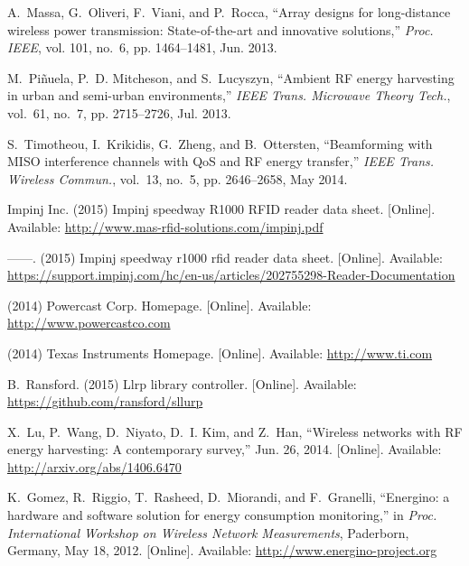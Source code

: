 \documentclass[11pt,draftclsnofoot,journal,onecolumn]{IEEEtran}
\begin{document}
\begin{thebibliography}{10}
{
A.~{Massa}, G.~{Oliveri}, F.~{Viani}, and P.~{Rocca}, ``Array designs for
  long-distance wireless power transmission: State-of-the-art and innovative
  solutions,'' \emph{Proc. {IEEE}}, vol. 101, no.~6, pp. 1464--1481, Jun. 2013.

M.~{Pi{\~{n}}uela}, P.~D. {Mitcheson}, and S.~{Lucyszyn}, ``Ambient {RF} energy
  harvesting in urban and semi-urban environments,'' \emph{{IEEE} Trans.
  Microwave Theory Tech.}, vol.~61, no.~7, pp. 2715--2726, Jul. 2013.

S.~{Timotheou}, I.~{Krikidis}, G.~{Zheng}, and B.~{Ottersten}, ``Beamforming
  with {MISO} interference channels with {QoS} and {RF} energy transfer,''
  \emph{{IEEE} Trans. Wireless Commun.}, vol.~13, no.~5, pp. 2646--2658, May
  2014.

\BIBentryALTinterwordspacing
{Impinj Inc.} (2015) Impinj speedway {R1000} {RFID} reader data sheet.
  [Online]. Available: \url{http://www.mas-rfid-solutions.com/impinj.pdf}
\BIBentrySTDinterwordspacing

\BIBentryALTinterwordspacing
------. (2015) Impinj speedway r1000 rfid reader data sheet. [Online].
  Available:
  \url{https://support.impinj.com/hc/en-us/articles/202755298-Reader-Documentation}
\BIBentrySTDinterwordspacing

\BIBentryALTinterwordspacing
(2014) Powercast Corp. Homepage. [Online]. Available:
  \url{http://www.powercastco.com}
\BIBentrySTDinterwordspacing

\BIBentryALTinterwordspacing
(2014) Texas Instruments Homepage. [Online]. Available: \url{http://www.ti.com}
\BIBentrySTDinterwordspacing

\BIBentryALTinterwordspacing
B.~Ransford. (2015) Llrp library controller. [Online]. Available:
  \url{https://github.com/ransford/sllurp}
\BIBentrySTDinterwordspacing

\BIBentryALTinterwordspacing
X.~{Lu}, P.~{Wang}, D.~{Niyato}, D.~I. {Kim}, and Z.~{Han}, ``Wireless networks
  with {RF} energy harvesting: A contemporary survey,'' Jun. 26, 2014.
  [Online]. Available: \url{http://arxiv.org/abs/1406.6470}
\BIBentrySTDinterwordspacing

\BIBentryALTinterwordspacing
K.~{Gomez}, R.~{Riggio}, T.~{Rasheed}, D.~{Miorandi}, and F.~{Granelli},
  ``Energino: a hardware and software solution for energy consumption
  monitoring,'' in \emph{Proc. International Workshop on Wireless Network
  Measurements}, Paderborn, Germany, May 18, 2012. [Online]. Available:
  \url{http://www.energino-project.org}
\BIBentrySTDinterwordspacing

}
\end{thebibliography}
\end{document}
